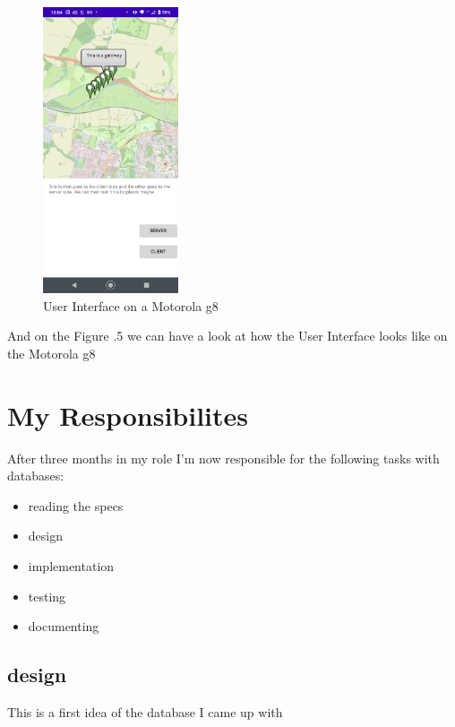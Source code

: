 \documentclass[a4paper,12pt]{article}
\begin{document}
\clearpage


\begin{figure}
\includegraphics[width=4cm]{./current_status_g8.PNG}
\caption{User Interface on a Motorola g8}\label{wrap-fig:5}
\end{figure}


And on the Figure .5 we can have a look at how the User Interface looks like on the Motorola g8









\section{My Responsibilites}

After three months in my role I'm now responsible for the following tasks with databases:

\begin{itemize}
\item {reading the specs}
\item design
\item implementation
\item testing 
\item documenting
\end{itemize}

\clearpage

\subsection{design}
This is a first idea of the database I came up with
\end{document}
